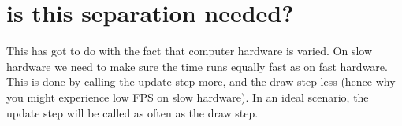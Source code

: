 \hypertarget{group___why}{\section{is this separation needed?}
\label{group___why}
}
This has got to do with the fact that computer hardware is varied. On slow hardware we need to make sure the time runs equally fast as on fast hardware. This is done by calling the update step more, and the draw step less (hence why you might experience low F\+P\+S on slow hardware). In an ideal scenario, the update step will be called as often as the draw step. 